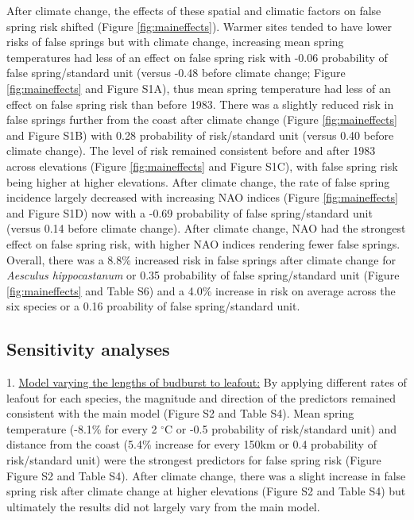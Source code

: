 \documentclass{article}\usepackage[]{graphicx}\usepackage[]{color}
\begin{document}
After climate change, the effects of these spatial and climatic factors on false spring risk shifted (Figure \ref{fig:maineffects}). Warmer sites tended to have lower risks of false springs but with climate change, increasing mean spring temperatures had less of an effect on false spring risk with -0.06 probability of false spring/standard unit (versus -0.48 before climate change; Figure \ref{fig:maineffects} and Figure S1A), thus mean spring temperature had less of an effect on false spring risk than before 1983. There was a slightly reduced risk in false springs further from the coast after climate change (Figure \ref{fig:maineffects} and Figure S1B) with 0.28 probability of risk/standard unit (versus 0.40 before climate change). The level of risk remained consistent before and after 1983 across elevations (Figure \ref{fig:maineffects} and Figure S1C), with false spring risk being higher at higher elevations. After climate change, the rate of false spring incidence largely decreased with increasing NAO indices (Figure \ref{fig:maineffects} and Figure S1D) now with a -0.69 probability of false spring/standard unit (versus 0.14 before climate change). After climate change, NAO had the strongest effect on false spring risk, with higher NAO indices rendering fewer false springs. Overall, there was a 8.8\% increased risk in false springs after climate change for \textit{Aesculus hippocastanum} or 0.35 probability of false spring/standard unit (Figure \ref{fig:maineffects} and Table S6) and a 4.0\% increase in risk on average across the six species or a 0.16 proability of false spring/standard unit.

\subsection*{Sensitivity analyses}
1. \underline{Model varying the lengths of budburst to leafout:} By applying different rates of leafout for each species, the magnitude and direction of the predictors remained consistent with the main model (Figure S2 and Table S4). Mean spring temperature (-8.1\% for every 2 $^\circ$C or -0.5 probability of risk/standard unit) and distance from the coast (5.4\% increase for every 150km or 0.4 probability of risk/standard unit) were the strongest predictors for false spring risk (Figure Figure S2 and Table S4). After climate change, there was a slight increase in false spring risk after climate change at higher elevations (Figure S2 and Table S4) but ultimately the results did not largely vary from the main model. 
\end{document}

